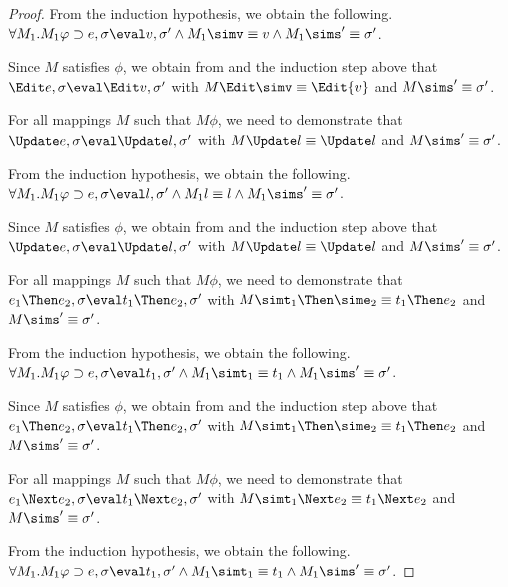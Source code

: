 \begin{proof}
{  From the induction hypothesis, we obtain the following.\\
  $\forall M_1 .  M_1\phi \implies e, \sigma {\eval}{v},{\sigma'}\land  M_1\simv\equiv {v} \land  M_1\sims'\equiv{\sigma'}$.

  Since $M$ satisfies $\phi$,
  we obtain from  and the induction step above that $\Edit e,\sigma\eval\Edit v,\sigma'$ with $M \Edit \simv\equiv \Edit {v}$ and $ M\sims'\equiv{\sigma'}$.

  }

  {For all mappings $M$ such that $M\phi$, we need to demonstrate that $\Update e,\sigma\eval\Update l,\sigma'$ with
  $M \Update l \equiv \Update l$ and $M\sims'\equiv{\sigma'}$.

  From the induction hypothesis, we obtain the following.\\
  $\forall M_1 .  M_1\phi \implies e, \sigma {\eval}l,{\sigma'}\land  M_1 l\equiv l \land  M_1\sims'\equiv{\sigma'}$.

  Since $M$ satisfies $\phi$,
  we obtain from  and the induction step above that $\Update e,\sigma\eval\Update l,\sigma'$ with $M \Update l\equiv \Update l$ and $M \sims' \equiv{\sigma'}$.

  }

  {For all mappings $M$ such that $M\phi$, we need to demonstrate that\\
  $e_1\Then e_2,\sigma\eval t_1\Then e_2,\sigma'$ with
  $M \simt_1\Then \sime_2 \equiv {t_1}\Then e_2$ and $M\sims'\equiv{\sigma'}$.

  From the induction hypothesis, we obtain the following.\\
  $\forall M_1 .  M_1\phi \implies e, \sigma {\eval}{t_1},{\sigma'}\land  M_1 \simt_1\equiv {t_1} \land  M_1\sims'\equiv{\sigma'}$.

  Since $M$ satisfies $\phi$,
  we obtain from  and the induction step above that $e_1\Then e_2,\sigma\eval t_1\Then e_2,\sigma'$ with $M \simt_1\Then \sime_2 \equiv {t_1}\Then e_2$ and $M \sims' \equiv\sigma'$.

  }

  {For all mappings $M$ such that $M\phi$, we need to demonstrate that\\
  $e_1\Next e_2,\sigma\eval t_1\Next e_2,\sigma'$ with
  $M \simt_1\Next e_2 \equiv {t_1}\Next e_2$ and $M\sims'\equiv{\sigma'}$.

  From the induction hypothesis, we obtain the following.\\
  $\forall M_1 .  M_1\phi \implies e,\sigma {\eval}{t_1},{\sigma'}\land  M_1 \simt_1\equiv {t_1} \land  M_1\sims'\equiv{\sigma'}$.

}
\end{proof}
